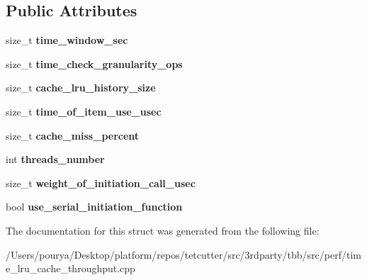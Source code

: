 \subsection*{Public Attributes}
\begin{DoxyCompactItemize}
\item 
\hypertarget{structparameter__pack_a72e0e087ddffeff67119420dc8c9d7ed}{}size\+\_\+t {\bfseries time\+\_\+window\+\_\+sec}\label{structparameter__pack_a72e0e087ddffeff67119420dc8c9d7ed}

\item 
\hypertarget{structparameter__pack_a8694c021425f7beffcb8b00eeee2f5bd}{}size\+\_\+t {\bfseries time\+\_\+check\+\_\+granularity\+\_\+ops}\label{structparameter__pack_a8694c021425f7beffcb8b00eeee2f5bd}

\item 
\hypertarget{structparameter__pack_a01761da54b74211c214b14e3722f7fc9}{}size\+\_\+t {\bfseries cache\+\_\+lru\+\_\+history\+\_\+size}\label{structparameter__pack_a01761da54b74211c214b14e3722f7fc9}

\item 
\hypertarget{structparameter__pack_aec454a7ed1ffe7b2d4e1e481cd971bef}{}size\+\_\+t {\bfseries time\+\_\+of\+\_\+item\+\_\+use\+\_\+usec}\label{structparameter__pack_aec454a7ed1ffe7b2d4e1e481cd971bef}

\item 
\hypertarget{structparameter__pack_a10c0a16d3a150fed516ae0d3cb0f76a5}{}size\+\_\+t {\bfseries cache\+\_\+miss\+\_\+percent}\label{structparameter__pack_a10c0a16d3a150fed516ae0d3cb0f76a5}

\item 
\hypertarget{structparameter__pack_a16bb50c52024df658fa3e265231c3b50}{}int {\bfseries threads\+\_\+number}\label{structparameter__pack_a16bb50c52024df658fa3e265231c3b50}

\item 
\hypertarget{structparameter__pack_a13c79a4ec2a98f6ebc1c80196a40dbb5}{}size\+\_\+t {\bfseries weight\+\_\+of\+\_\+initiation\+\_\+call\+\_\+usec}\label{structparameter__pack_a13c79a4ec2a98f6ebc1c80196a40dbb5}

\item 
\hypertarget{structparameter__pack_ab12d6421055b877d7b4fc685b4c03208}{}bool {\bfseries use\+\_\+serial\+\_\+initiation\+\_\+function}\label{structparameter__pack_ab12d6421055b877d7b4fc685b4c03208}

\end{DoxyCompactItemize}


The documentation for this struct was generated from the following file\+:\begin{DoxyCompactItemize}
\item 
/\+Users/pourya/\+Desktop/platform/repos/tetcutter/src/3rdparty/tbb/src/perf/time\+\_\+lru\+\_\+cache\+\_\+throughput.\+cpp\end{DoxyCompactItemize}
